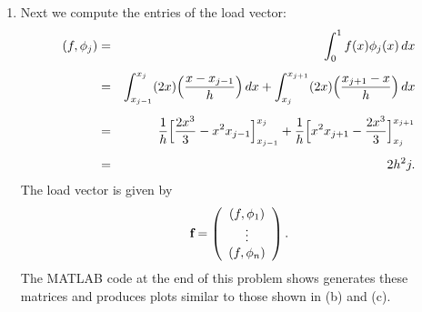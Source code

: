 {\begin{solution}
\begin{enumerate}
\[\begin{array}{ccc}
                           \vdots & \ddots & \vdots \\
                          a(\phi_n,\phi_1) & \cdots & a(\phi_n, \phi_n)\end{array}\right].\]
\item
Next we compute the entries of the load vector:
\begin{eqnarray*}
(f,\phi_j) &=& \int_0^1 f(x) \phi_j(x)\,dx \\[0.5em]
           &=& \int_{x_{j-1}}^{x_{j}} (2x)\Big( {x-x_{j-1} \over h}\Big)\, dx 
              +\int_{x_{j}}^{x_{j+1}}  (2x)\Big( {x_{j+1}-x \over h}\Big)\, dx  \\[0.5em]
           &=& {1\over h}\Big[ {2x^3\over 3}  - x^2 x_{j-1}\Big]_{x_{j-1}}^{x_j}
              +{1\over h}\Big[ x^2 x_{j+1} - {2x^3 \over 3} \Big]_{x_{j}}^{x_{j+1}} \\[0.5em]
           &=&  2h^2 j.
\end{eqnarray*} 
The load vector is given by
\[ \textbf{f} = \left(\begin{array}{cc} (f,\phi_1) \cr \vdots \cr (f,\phi_n)\end{array}\right).\] 
The MATLAB code at the end of this problem shows generates these matrices
and produces plots similar to those shown in (b) and (c).


\end{enumerate}
\end{solution}}
